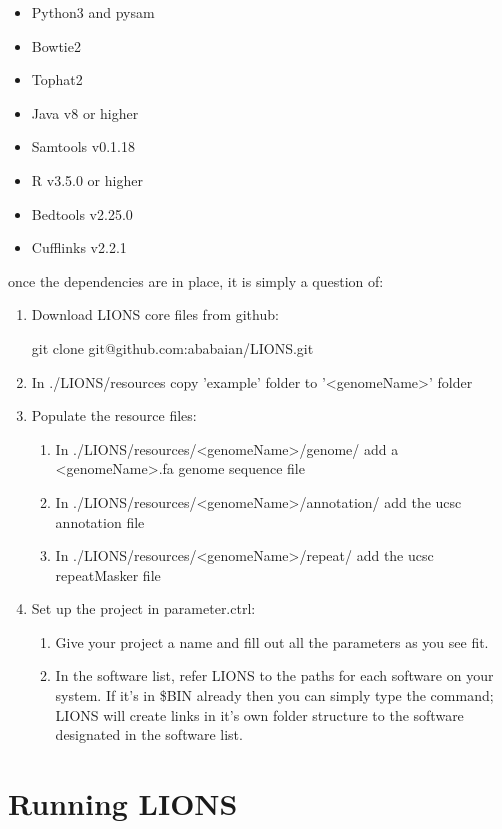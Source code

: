 \documentclass[11pt]{scrartcl}
\newcommand{\arrows}[1]{\textless #1\textgreater}
\begin{document}
\begin{itemize}
\item Python3 and pysam
\item Bowtie2
\item Tophat2
\item Java v8 or higher
\item Samtools v0.1.18
\item R v3.5.0 or higher
\item Bedtools v2.25.0
\item Cufflinks v2.2.1
\end{itemize}

once the dependencies are in place, it is simply a question of:
\begin{enumerate}
\item Download LIONS core files from github:  
\begin{bash}
git clone git@github.com:ababaian/LIONS.git
\end{bash}
\item In ./LIONS/resources copy 'example' folder to '\arrows{genomeName}' folder

\item Populate the resource files:
\begin{enumerate}
\item In ./LIONS/resources/\arrows{genomeName}/genome/ add a \arrows{genomeName}.fa genome sequence file
\item In ./LIONS/resources/\arrows{genomeName}/annotation/ add the ucsc annotation file
\item In ./LIONS/resources/\arrows{genomeName}/repeat/ add the ucsc repeatMasker file
\end{enumerate}
\item Set up the project in parameter.ctrl:
\begin{enumerate}
\item Give your project a name and fill out all the parameters as you see fit.
\item In the software list, refer LIONS to the paths for each software on your system. If it's in \$BIN already then you can simply type the command; LIONS will create links in it's own folder structure to the software designated in the software list.
\end{enumerate}
\end{enumerate}

\clearpage
\section{Running LIONS}
\label{lions_run}
\end{document}
